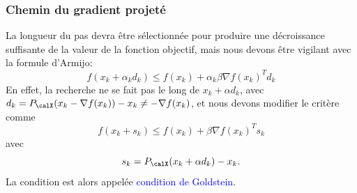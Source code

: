 \documentclass[t,aspectratio=169,usepdftitle=false]{beamer}
\def\cX{\calX}
\begin{document}
\begin{frame}
\frametitle{Chemin du gradient projeté}

La longueur du pas devra être sélectionnée pour produire une décroissance suffisante de la valeur de la fonction objectif, mais nous devons être vigilant avec la formule d'Armijo:
$$
f(x_k + \alpha_k d_k ) \leq f(x_k) + \alpha_k \beta \nabla f(x_k)^T d_k
$$
En effet, la recherche ne se fait pas le long de $x_k + \alpha d_k$, avec
$d_k = P_{\cX} (x_k - \nabla f(x_k)) - x_k \ne -\nabla f(x_k)$,
et nous devons modifier le critère comme
$$
f(x_k + s_k ) \leq f(x_k) + \beta \nabla f(x_k)^T s_k
$$
avec
$$
s_k = P_{\cX}(x_k + \alpha d_k)-x_k.
$$
La condition est alors appelée \textcolor{blue}{condition de Goldstein}.

\end{frame}
\end{document}
